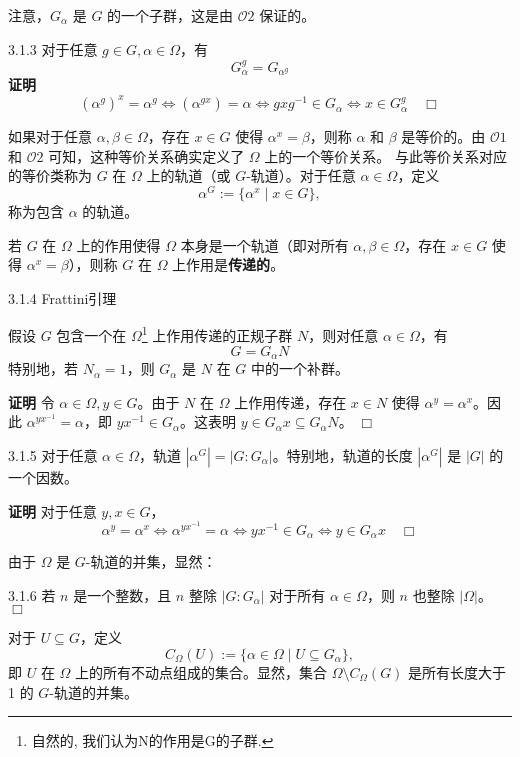 \documentclass[UTF8]{ctexart}
\begin{document}
注意，$G_\alpha$ 是 $G$ 的一个子群，这是由 $\mathcal{O}2$ 保证的。



3.1.3
对于任意 $g \in G, \alpha \in \Omega$，有
$$
    G_\alpha^g = G_{\alpha^g}
$$
\textbf{证明}
$$
    (\alpha^g)^x = \alpha^g \iff (\alpha^{gx}) = \alpha \iff gxg^{-1} \in G_\alpha \iff x \in G_\alpha^g \quad \Box
$$





如果对于任意 $\alpha, \beta \in \Omega$，存在 $x \in G$ 使得 $\alpha^x = \beta$，则称 $\alpha$ 和 $\beta$ 是等价的。由 $\mathcal{O}1$ 和 $\mathcal{O}2$ 可知，这种等价关系确实定义了 $\Omega$ 上的一个等价关系。
与此等价关系对应的等价类称为 $G$ 在 $\Omega$ 上的轨道（或 $G$-轨道）。对于任意 $\alpha \in \Omega$，定义
$$
    \alpha^G := \{\alpha^x \mid x \in G\},
$$
称为包含 $\alpha$ 的轨道。

若 $G$ 在 $\Omega$ 上的作用使得 $\Omega$ 本身是一个轨道（即对所有 $\alpha, \beta \in \Omega$，存在 $x \in G$ 使得 $\alpha^x = \beta$），则称 $G$ 在 $\Omega$ 上作用是\textbf{传递的}。



3.1.4 Frattini引理


假设 $G$ 包含一个在 $\Omega$\footnote[4]{自然的, 我们认为N的作用是G的子群.} 上作用传递的正规子群 $N$，则对任意 $\alpha \in \Omega$，有
$$
    G = G_\alpha N
$$
特别地，若 $N_\alpha = 1$，则 $G_\alpha$ 是 $N$ 在 $G$ 中的一个补群。


\textbf{证明}
令 $\alpha \in \Omega, y \in G$。由于 $N$ 在 $\Omega$ 上作用传递，存在 $x \in N$ 使得 $\alpha^y = \alpha^x$。因此 $\alpha^{yx^{-1}} = \alpha$，即 $yx^{-1} \in G_\alpha$。这表明 $y \in G_\alpha x \subseteq G_\alpha N$。 $\Box$



3.1.5
对于任意 $\alpha \in \Omega$，轨道 $|\alpha^G| = |G : G_\alpha|$。特别地，轨道的长度 $|\alpha^G|$ 是 $|G|$ 的一个因数。


\textbf{证明}
对于任意 $y, x \in G$，
$$
    \alpha^y = \alpha^x \iff \alpha^{yx^{-1}} = \alpha \iff yx^{-1} \in G_\alpha \iff y \in G_\alpha x \quad \Box
$$

由于 $\Omega$ 是 $G$-轨道的并集，显然：


3.1.6
若 $n$ 是一个整数，且 $n$ 整除 $|G : G_\alpha|$ 对于所有 $\alpha \in \Omega$，则 $n$ 也整除 $|\Omega|$。 $\Box$



对于 $U \subseteq G$，定义
$$
    C_\Omega(U) := \{\alpha \in \Omega \mid U \subseteq G_\alpha\},
$$
即 $U$ 在 $\Omega$ 上的所有不动点组成的集合。显然，集合 $\Omega \setminus C_\Omega(G)$ 是所有长度大于 1 的 $G$-轨道的并集。
\end{document}
